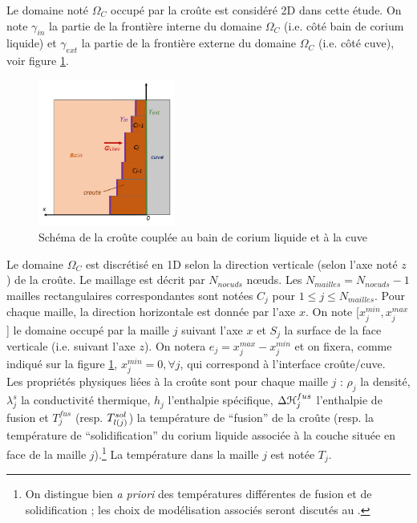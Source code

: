 Le domaine noté $\Omega_C$ occupé par la croûte est considéré 2D dans cette étude. On note $\gamma_{in}$ la partie de la frontière interne du domaine $\Omega_C$ (i.e. côté bain de corium liquide) et $\gamma_{ext}$ la partie de la frontière externe du domaine $\Omega_C$ (i.e. côté cuve), voir figure \ref{fig:crust_figure}. 

\begin{figure}[H]
\centering
\includegraphics[width=0.4\textwidth]{Figures/crust_figure.png}
\caption{Schéma de la croûte couplée au bain de corium liquide et à la cuve} \label{fig:crust_figure}
\end{figure}

Le domaine $\Omega_C$ est discrétisé en 1D selon la direction verticale (selon l'axe noté $z$) de la croûte. Le maillage est décrit par $N_{noeuds}$ n\oe{}uds. Les $N_{mailles}=N_{noeuds}-1$ mailles rectangulaires correspondantes sont notées $C_j$ pour $1 \leq j\leq N_{mailles}$. Pour chaque maille, la direction horizontale est donnée par l'axe $x$. On note [$x_j^{min}, x_j^{max}$] le domaine occupé par la maille $j$ suivant l'axe $x$ et $S_j$ la surface de la face verticale (i.e. suivant l'axe $z$). On notera $e_j=x_j^{max}-x_j^{min}$ et on fixera, comme indiqué sur la figure \ref{fig:crust_figure}, $x_j^{min}=0,\forall j$, qui correspond à l'interface croûte/cuve.\\

Les propriétés physiques liées à la croûte sont pour chaque maille $j$ : $\rho_j$ la densité, $\lambda^s_j$ la conductivité thermique, $h_j$ l'enthalpie spécifique, $\Delta {\cal H}_j^{fus}$ l'enthalpie de fusion et $T_j^{fus}$ (resp. $\temperature[sol]{l(j)}$) la température de ``fusion'' de la croûte (resp. la température de ``solidification'' du corium liquide associée à la couche située en face de la maille $j$).\footnote{On distingue bien \textit{a priori} des températures différentes de fusion et de solidification ; les choix de modélisation associés seront discutés au .} La température dans la maille $j$ est notée $T_j$.



